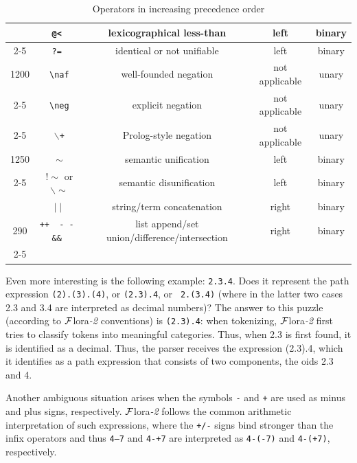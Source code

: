 \documentclass[11pt]{article}
\newcommand{\FLORA}{{\mbox{\sc ${\cal F}${lora}\rm\emph{-2}}}\xspace}
\newcommand{\FLSYSTEM}{\FLORA}
\newcommand{\bs}{\textbackslash}
\newcommand{\RULELOGNAF}{{\texttt{{\bs}naf}}\xspace}
\newcommand{\RULELOGNEG}{{\texttt{{\bs}neg}}\xspace}
\begin{document}
\begin{table}[htb]
{\begin{tabular}{|c|c|c|c|c|}
            &\tt @< & lexicographical less-than & left & binary \\  \cline{2-5}
            &\tt ?= & identical or not unifiable & left & binary \\ \hline
1200        & \RULELOGNAF & well-founded negation & not applicable & unary \\ \cline{2-5}
            & \RULELOGNEG & explicit negation & not applicable & unary \\ \cline{2-5}
            & \texttt{$\backslash$+} & Prolog-style negation & not applicable & unary \\ \hline
1250        & \texttt{$\sim$} & semantic unification & left & binary \\ \cline{2-5}
            & \texttt{$!\sim$} or \texttt{$\backslash\sim$} & semantic disunification & left & binary \\ \hline
\ifdef{\isfloraman}{}
{
     990    & \texttt{$\mid\mid$} & string/term concatenation & right & binary \\ \hline
     290    &\tt ++~ -\,-~ \&\& & list append/set union/difference/intersection & right & binary \\ \cline{2-5}
\hline
}
\end{tabular}
}
\caption{Operators in increasing precedence order}
\label{tab:tab-op-pre}
\end{table}

Even more interesting is the following example: {\tt 2.3.4}. Does it
represent the path expression {\tt (2).(3).(4)}, or {\tt (2.3).4}, or {\tt
  2.(3.4)} (where in the latter two cases 2.3 and 3.4 are interpreted as
decimal numbers)? The answer to this puzzle (according to \FLSYSTEM conventions)
is {\tt (2.3).4}: when
tokenizing, \FLSYSTEM first tries to classify tokens into meaningful
categories. Thus, when 2.3 is first found, it is identified as a
decimal. Thus, the parser receives the expression (2.3).4, which it
identifies as a path expression that consists of two components, the oids
2.3 and 4.

Another ambiguous situation arises when the symbols {\tt -} and {\tt +} are
used as minus and plus
signs, respectively. \FLSYSTEM follows the common arithmetic interpretation of
such expressions, where the {\tt +/-} signs bind stronger than the infix
operators and thus
{\tt 4--7} and {\tt 4-+7} are interpreted as {\tt 4-(-7)} and {\tt 4-(+7)},
respectively.
\end{document}
